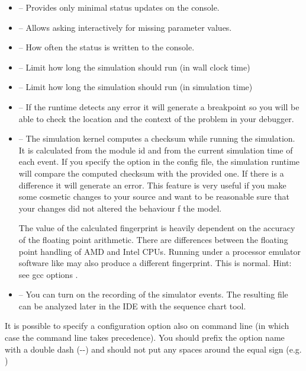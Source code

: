 \begin{itemize}
  \item {} -- Provides only minimal status updates on the console.
  \item {} -- Allows asking interactively for missing
        parameter values.
  \item {} -- How often the status is written to the console.
  \item {} -- Limit how long the simulation should run (in wall clock time)
  \item {} -- Limit how long the simulation should run (in simulation time)
  \item {} -- If the runtime detects any error it will generate a breakpoint
        so you will be able to check the location and the context of the problem in your debugger.
  \item {} -- The simulation kernel computes a checksum while running the simulation.
          It is calculated from the module id and from the current simulation time of each event.
          If you specify the  option in the config file, the simulation runtime will
          compare the computed checksum with the provided one. If there is a difference it will
          generate an error. This feature is very useful if you make some cosmetic changes to your
          source and want to be reasonable sure that your changes did not altered the behaviour
          f the model.
          \begin{warning}
          The value of the calculated fingerprint is heavily dependent on the accuracy of the floating
          point arithmetic. There are differences between the floating point handling of AMD and Intel CPUs.
          Running under a processor emulator software like  may also produce
          a different fingerprint. This is normal. Hint: see gcc options .
          \end{warning}
  \item {} -- You can turn on the recording of the simulator events. The
           resulting file can be analyzed later in the IDE with the sequence chart tool.
\end{itemize}

\begin{note}
  It is possible to specify a configuration option also on command line (in which case the
  command line takes precedence). You should prefix the option name with a double
  dash (-{}-) and should not put any spaces around the equal sign
  (e.g. )
\end{note}

